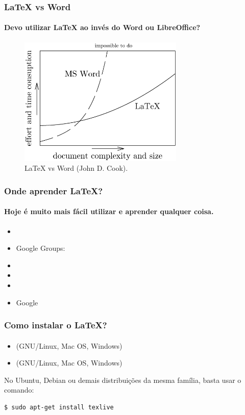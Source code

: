 \begin{frame}
\frametitle{\LaTeX{} vs Word}
\framesubtitle{Devo utilizar \LaTeX{} ao invés do Word ou LibreOffice?}
  \begin{figure}[h!]
  \centering
  \includegraphics[width=0.7\textwidth]{figures/word_vs_latex.png}
  \caption{\LaTeX{} vs Word (John D. Cook).}
  \label{fig:word_vs_latex}
  \end{figure}
\end{frame}

\begin{frame}
\frametitle{Onde aprender \LaTeX{}?}
\framesubtitle{Hoje é muito mais fácil utilizar e aprender qualquer coisa.}
\begin{itemize}
  \item {}
  \item Google Groups: 
  \item {}
  \item {}
  \item {}
  \item Google
\end{itemize}
\end{frame}


\begin{frame}[fragile]
\frametitle{Como instalar o \LaTeX{}?}
\framesubtitle{}
\begin{itemize}
  \item {} (GNU/Linux, Mac OS, Windows)
  \item {} (GNU/Linux, Mac OS, Windows)
\end{itemize}
\vspace{3ex}

No Ubuntu, Debian ou demais distribuições da mesma família, basta usar o comando:
\begin{verbatim}
$ sudo apt-get install texlive
\end{verbatim}

\end{frame}


